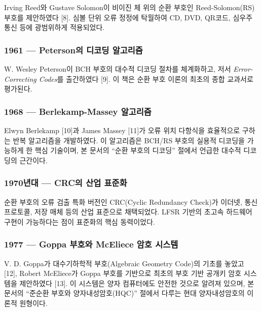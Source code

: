 \documentclass[
  oneside]{article}
\begin{document}
Irving Reed와 Gustave Solomon이 비이진 체 위의 순환 부호인
Reed-Solomon(RS) 부호를 제안하였다 {[}8{]}. 심볼 단위 오류 정정에
탁월하여 CD, DVD, QR코드, 심우주 통신 등에 광범위하게 적용되었다.

\subsubsection{1961 --- Peterson의 디코딩
알고리즘}\label{petersonuxc758-uxb514uxcf54uxb529-uxc54cuxace0uxb9acuxc998}

W. Wesley Peterson이 BCH 부호의 대수적 디코딩 절차를 체계화하고, 저서
\emph{Error-Correcting Codes}를 출간하였다 {[}9{]}. 이 책은 순환 부호
이론의 최초의 종합 교과서로 평가된다.

\subsubsection{1968 --- Berlekamp-Massey
알고리즘}\label{berlekamp-massey-uxc54cuxace0uxb9acuxc998}

Elwyn Berlekamp {[}10{]}과 James Massey {[}11{]}가 오류 위치 다항식을
효율적으로 구하는 반복 알고리즘을 개발하였다. 이 알고리즘은 BCH/RS
부호의 실용적 디코딩을 가능하게 한 핵심 기술이며, 본 문서의 ``순환
부호의 디코딩'' 절에서 언급한 대수적 디코딩의 근간이다.

\subsubsection{1970년대 --- CRC의 산업
표준화}\label{uxb144uxb300-crcuxc758-uxc0b0uxc5c5-uxd45cuxc900uxd654}

순환 부호의 오류 검출 특화 버전인 CRC(Cyclic Redundancy Check)가 이더넷,
통신 프로토콜, 저장 매체 등의 산업 표준으로 채택되었다. LFSR 기반의
초고속 하드웨어 구현이 가능하다는 점이 표준화의 핵심 동력이었다.

\subsubsection{1977 --- Goppa 부호와 McEliece 암호
시스템}\label{goppa-uxbd80uxd638uxc640-mceliece-uxc554uxd638-uxc2dcuxc2a4uxd15c}

V. D. Goppa가 대수기하학적 부호(Algebraic Geometry Code)의 기초를 놓았고
{[}12{]}, Robert McEliece가 Goppa 부호를 기반으로 최초의 부호 기반
공개키 암호 시스템을 제안하였다 {[}13{]}. 이 시스템은 양자 컴퓨터에도
안전한 것으로 알려져 있으며, 본 문서의 ``준순환 부호와
양자내성암호(HQC)'' 절에서 다루는 현대 양자내성암호의 이론적 원형이다.
\end{document}
